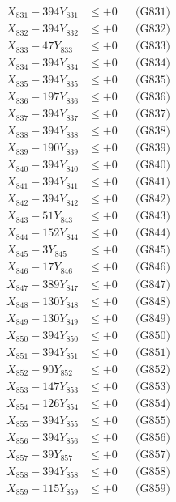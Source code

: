 \documentclass[a4paper,10pt]{article}
\begin{document}
{\begin{align}
\allowbreak
X_{831} - 394Y_{831} &\leq +0 && \text{(G831)} \\
X_{832} - 394Y_{832} &\leq +0 && \text{(G832)} \\
X_{833} - 47Y_{833} &\leq +0 && \text{(G833)} \\
X_{834} - 394Y_{834} &\leq +0 && \text{(G834)} \\
X_{835} - 394Y_{835} &\leq +0 && \text{(G835)} \\
X_{836} - 197Y_{836} &\leq +0 && \text{(G836)} \\
X_{837} - 394Y_{837} &\leq +0 && \text{(G837)} \\
X_{838} - 394Y_{838} &\leq +0 && \text{(G838)} \\
X_{839} - 190Y_{839} &\leq +0 && \text{(G839)} \\
X_{840} - 394Y_{840} &\leq +0 && \text{(G840)} \\
\allowbreak
X_{841} - 394Y_{841} &\leq +0 && \text{(G841)} \\
X_{842} - 394Y_{842} &\leq +0 && \text{(G842)} \\
X_{843} - 51Y_{843} &\leq +0 && \text{(G843)} \\
X_{844} - 152Y_{844} &\leq +0 && \text{(G844)} \\
X_{845} - 3Y_{845} &\leq +0 && \text{(G845)} \\
X_{846} - 17Y_{846} &\leq +0 && \text{(G846)} \\
X_{847} - 389Y_{847} &\leq +0 && \text{(G847)} \\
X_{848} - 130Y_{848} &\leq +0 && \text{(G848)} \\
X_{849} - 130Y_{849} &\leq +0 && \text{(G849)} \\
X_{850} - 394Y_{850} &\leq +0 && \text{(G850)} \\
\allowbreak
X_{851} - 394Y_{851} &\leq +0 && \text{(G851)} \\
X_{852} - 90Y_{852} &\leq +0 && \text{(G852)} \\
X_{853} - 147Y_{853} &\leq +0 && \text{(G853)} \\
X_{854} - 126Y_{854} &\leq +0 && \text{(G854)} \\
X_{855} - 394Y_{855} &\leq +0 && \text{(G855)} \\
X_{856} - 394Y_{856} &\leq +0 && \text{(G856)} \\
X_{857} - 39Y_{857} &\leq +0 && \text{(G857)} \\
X_{858} - 394Y_{858} &\leq +0 && \text{(G858)} \\
X_{859} - 115Y_{859} &\leq +0 && \text{(G859)} \\

\end{align}}
\end{document}
